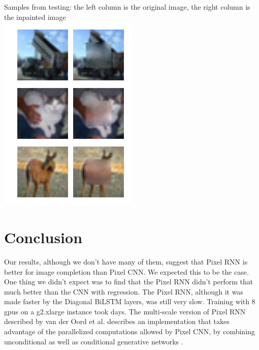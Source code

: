 \documentclass[10pt,twocolumn,letterpaper]{article}
\begin{document}
Samples from testing: the left column is the original image, the right column is the inpainted image \\
\includegraphics[width=0.8\linewidth]{baseline_test.jpg} 

\section{Conclusion}
Our results, although we don't have many of them, suggest that Pixel RNN is better for image completion than Pixel CNN. We expected this to be the case. One thing we didn't expect was to find that the Pixel RNN didn't perform that much better than the CNN with regression. The Pixel RNN, although it was made faster by the Diagonal BiLSTM layers, was still very slow. Training with 8 gpus on a g2.xlarge instance took days. The multi-scale version of Pixel RNN described by van der Oord et al. describes an implementation that takes advantage of the parallelized computations allowed by Pixel CNN, by combining unconditional as well as conditional generative networks \cite{pixelRNN}. \\
\end{document}
